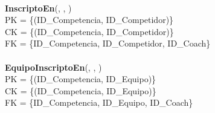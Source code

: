 \\
\textbf{InscriptoEn}(, , )\\
PK = \{(ID\_Competencia, ID\_Competidor)\}\\
CK = \{(ID\_Competencia, ID\_Competidor)\}\\
FK = \{ID\_Competencia, ID\_Competidor, ID\_Coach\}\\
\\
\textbf{EquipoInscriptoEn}(, , )\\
PK = \{(ID\_Competencia, ID\_Equipo)\}\\
CK = \{(ID\_Competencia, ID\_Equipo)\}\\
FK = \{ID\_Competencia, ID\_Equipo, ID\_Coach\}\\
\\
